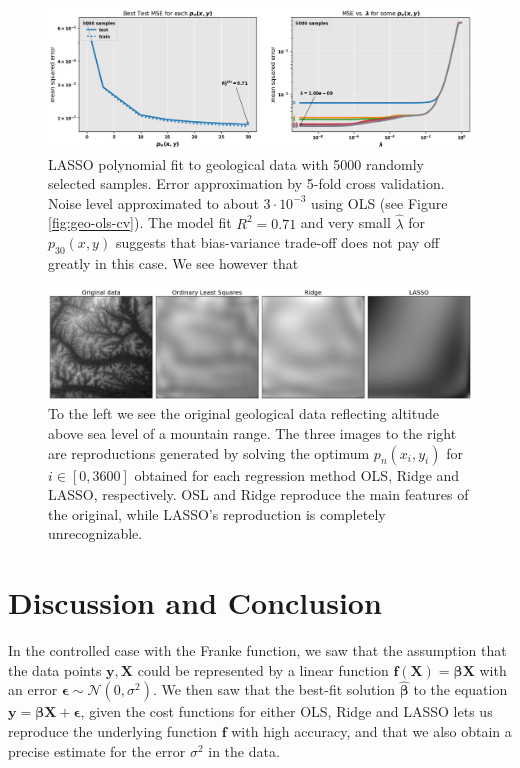 \documentclass[]{article}
\begin{document}
\begin{figure}[!htb]
	\centering
	\includegraphics[width=1\linewidth]{./results/geo-lasso-cv.png}
	\caption{LASSO polynomial fit to geological data with 5000 randomly selected samples. Error approximation by 5-fold cross validation. Noise level approximated to about $3 \cdot 10^{-3}$ using OLS (see Figure \ref{fig:geo-ols-cv}). The model fit $R^2 = 0.71$ and very small $\hat{\lambda}$ for $p_{30}(x,y)$ suggests that bias-variance trade-off does not pay off greatly in this case. We see however that }
	\label{fig:geo-lasso-cv}
\end{figure}

\begin{figure}[!htb]
	\centering
	\includegraphics[width=1\linewidth]{./results/geo-data.png}
	\caption{To the left we see the original geological data reflecting altitude above sea level of a mountain range. The three images to the right are reproductions generated by solving the optimum $p_{n}(x_i,y_i)$ for $i \in [0,3600]$ obtained for each regression method OLS, Ridge and LASSO, respectively. OSL and Ridge reproduce the main features of the original, while LASSO's reproduction is completely unrecognizable.}
	\label{fig:geo-data}
\end{figure}

\clearpage
\section{Discussion and Conclusion} \label{conclusion}
In the controlled case with the Franke function, we saw that the assumption that the data points $\mathbf{y}, \mathbf{X}$ could be represented by a linear function $\mathbf{f}(\mathbf{X}) = \mathbf{\beta X}$ with an error $\mathbf{\epsilon} \sim \mathcal{N}(0, \sigma^2)$. We then saw that the best-fit solution $\mathbf{\hat{\beta}}$ to the equation $\mathbf{y} = \mathbf{\beta X} + \mathbf{\epsilon}$, given the cost functions for either OLS, Ridge and LASSO lets us reproduce the underlying function $\mathbf{f}$ with high accuracy, and that we also obtain a precise estimate for the error $\sigma^2$ in the data.
\end{document}

